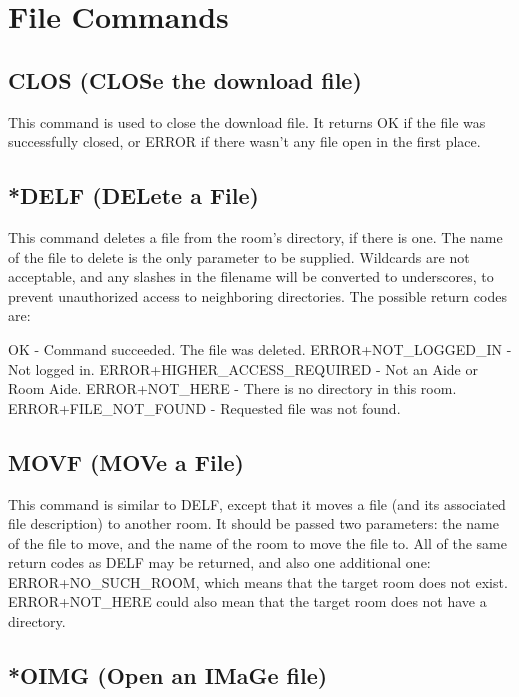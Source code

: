 \section{File Commands}



\subsection{CLOS (CLOSe the download file)}

 This command is used to close the download file.  It returns OK if the
file was successfully closed, or ERROR if there wasn't any file open in the
first place.



\subsection{*DELF (DELete a File)}

 This command deletes a file from the room's directory, if there is one.  The
name of the file to delete is the only parameter to be supplied.  Wildcards
are not acceptable, and any slashes in the filename will be converted to
underscores, to prevent unauthorized access to neighboring directories.  The
possible return codes are:

 OK                            -  Command succeeded.  The file was deleted.
 ERROR+NOT_LOGGED_IN           -  Not logged in.
 ERROR+HIGHER_ACCESS_REQUIRED  -  Not an Aide or Room Aide.
 ERROR+NOT_HERE                -  There is no directory in this room.
 ERROR+FILE_NOT_FOUND          -  Requested file was not found.



\subsection{MOVF (MOVe a File)}

 This command is similar to DELF, except that it moves a file (and its
associated file description) to another room.  It should be passed two
parameters: the name of the file to move, and the name of the room to move
the file to.  All of the same return codes as DELF may be returned, and also
one additional one: ERROR+NO_SUCH_ROOM, which means that the target room
does not exist.  ERROR+NOT_HERE could also mean that the target room does
not have a directory.



\subsection{*OIMG (Open an IMaGe file)}

